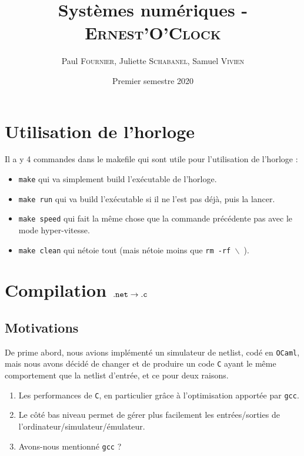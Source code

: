 \documentclass[10pt,a4paper,notitlepage ]{article}
\title{Systèmes numériques - \textsc{Ernest'O'Clock}}
\date{Premier semestre 2020}
\author{Paul \textsc{Fournier}, Juliette \textsc{Schabanel}, Samuel \textsc{Vivien}}
\begin{document}
	\maketitle
	\pagebreak
	\tableofcontents
	\pagebreak
	
	\section{Utilisation de l'horloge}

		Il a y 4 commandes dans le makefile qui sont utile pour l'utilisation de l'horloge :

		\begin{itemize}
			\item \texttt{make} qui va simplement build l'exécutable de l'horloge.
			\item \texttt{make run} qui va build l'exécutable si il ne l'est pas déjà, puis la lancer.
			\item \texttt{make speed} qui fait la même chose que la commande précédente pas avec le mode hyper-vitesse.
			\item \texttt{make clean} qui nétoie tout (mais nétoie moins que \texttt{rm -rf $\backslash$ }).
		\end{itemize}

	\section{Compilation $\tt{.net} \rightarrow \tt{.c}$}
	
	\subsection{Motivations}
	
	De prime abord, nous avions implémenté un simulateur de netlist, codé en \texttt{OCaml}, mais nous avons décidé de changer et de produire un code \texttt{C} ayant le même comportement que la netlist d'entrée, et ce pour deux raisons.
	\begin{enumerate}
		\item Les performances de \texttt{C}, en particulier grâce à l'optimisation apportée par \texttt{gcc}.
		\item Le côté bas niveau permet de gérer plus facilement les entrées/sorties de l'ordinateur/simulateur/émulateur.
		\item Avons-nous mentionné \texttt{gcc} ?
	\end{enumerate}
	
\end{document}
